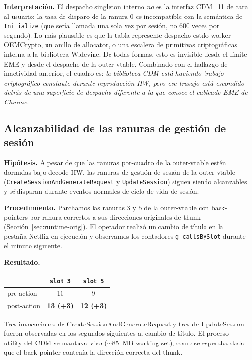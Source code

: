 \documentclass[11pt,letterpaper]{article}
\begin{document}
\textbf{Interpretación.} El despacho singleton interno
\emph{no} es la interfaz CDM\_11 de cara al usuario; la tasa de
disparo de la ranura 0 es incompatible con la semántica de
\texttt{Initialize} (que sería llamada una sola vez por sesión,
no 600 veces por segundo). Lo más plausible es que la tabla
represente despacho estilo worker OEMCrypto, un anillo de
allocator, o una escalera de primitivas criptográficas interna
a la biblioteca Widevine. De todas formas, esto es invisible
desde el límite EME y desde el despacho de la outer-vtable.
Combinado con el hallazgo de inactividad anterior, el cuadro es:
\emph{la biblioteca CDM está haciendo trabajo criptográfico
constante durante reproducción HW, pero ese trabajo está
escondido detrás de una superficie de despacho diferente a la que
conoce el cableado EME de Chrome}.

\subsection{Alcanzabilidad de las ranuras de gestión de sesión}
\label{sec:findings-session}

\textbf{Hipótesis.} A pesar de que las ranuras por-cuadro de la
outer-vtable estén dormidas bajo decode HW, las ranuras de
gestión-de-sesión de la outer-vtable
(\texttt{CreateSessionAndGenerateRequest} y
\texttt{UpdateSession}) siguen siendo alcanzables y \emph{sí}
disparan durante eventos normales de ciclo de vida de sesión.

\textbf{Procedimiento.} Parchamos las ranuras 3 y 5 de la
outer-vtable con back-pointers por-ranura correctos a sus
direcciones originales de thunk
(Sección~\ref{sec:runtime-orig}). El operador realizó un cambio
de título en la pestaña Netflix en ejecución y observamos los
contadores \texttt{g\_callsBySlot} durante el minuto siguiente.

\textbf{Resultado.}

\begin{center}\small
\begin{tabular}{lcc}
\toprule
& \texttt{slot 3} & \texttt{slot 5} \\
\midrule
pre-action & 10 & 9 \\
post-action & \textbf{13 (+3)} & \textbf{12 (+3)} \\
\bottomrule
\end{tabular}
\end{center}

\noindent Tres invocaciones de CreateSessionAndGenerateRequest y
tres de UpdateSession fueron observadas en los segundos siguientes
al cambio de título. El proceso utility del CDM se mantuvo vivo
($\sim$85~MB working set), como se esperaba dado que el
back-pointer contenía la dirección correcta del thunk.
\end{document}
